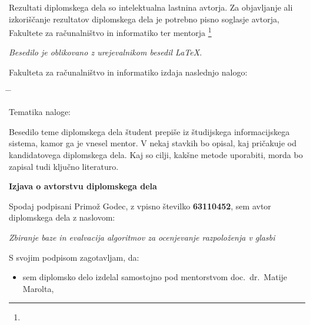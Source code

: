 \documentclass[a4paper, 12pt]{book}
\newcommand{\ttitle}{Zbiranje baze in evalvacija algoritmov za ocenjevanje razpoloženja v glasbi}
\newcommand{\clearemptydoublepage}{\newpage{\pagestyle{empty}\cleardoublepage}}
\begin{document}
\thispagestyle{empty}
\vspace*{8cm}
{\small \noindent
Rezultati diplomskega dela so intelektualna lastnina avtorja.
Za objavljanje ali izkoriščanje rezultatov di\-plom\-ske\-ga dela je potrebno pisno soglasje avtorja, Fakultete za ra\-ču\-nal\-niš\-tvo in
informatiko ter mentorja%
\footnote{}


\begin{center}
\mbox{}\vfill
\emph{Besedilo je oblikovano z urejevalnikom besedil \LaTeX.}
\end{center}
\clearemptydoublepage

\thispagestyle{empty}
\vspace*{4cm}

\noindent
Fakulteta za računalništvo in informatiko izdaja naslednjo nalogo:
\medskip
\begin{tabbing}
\hspace{32mm}\= \hspace{6cm} \= \kill




Tematika naloge:
\end{tabbing}
Besedilo teme diplomskega dela študent prepiše iz študijskega informacijskega sistema, kamor ga je vnesel mentor. V nekaj stavkih bo opisal, kaj pričakuje od kandidatovega diplomskega dela. Kaj so cilji, kakšne metode uporabiti, morda bo zapisal tudi ključno literaturo.
\vspace{15mm}






\vspace{2cm}

\clearemptydoublepage

\vspace*{1cm}
\begin{center}
{\Large \textbf{\sc Izjava o avtorstvu diplomskega dela}}
\end{center}

\vspace{1cm}
\noindent Spodaj podpisani Primož Godec,
z vpisno številko \textbf{63110452}, sem avtor  diplomskega dela z naslovom:

\vspace{0.5cm}
\emph{\ttitle}

\vspace{1.5cm}
\noindent S svojim podpisom zagotavljam, da:
\begin{itemize}
	\item sem diplomsko delo izdelal samostojno pod mentorstvom
		doc.\ dr.\ Matije Marolta,


\end{itemize}}
\end{document}
